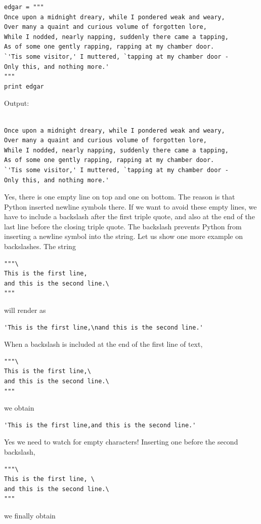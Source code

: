 \begin{verbatim}
edgar = """
Once upon a midnight dreary, while I pondered weak and weary,
Over many a quaint and curious volume of forgotten lore,
While I nodded, nearly napping, suddenly there came a tapping,
As of some one gently rapping, rapping at my chamber door.
`'Tis some visitor,' I muttered, `tapping at my chamber door -
Only this, and nothing more.'
"""
print edgar
\end{verbatim}
Output:

\begin{verbatim}

Once upon a midnight dreary, while I pondered weak and weary,
Over many a quaint and curious volume of forgotten lore,
While I nodded, nearly napping, suddenly there came a tapping,
As of some one gently rapping, rapping at my chamber door.
`'Tis some visitor,' I muttered, `tapping at my chamber door -
Only this, and nothing more.'

\end{verbatim}
Yes, there is one empty line on top and one on bottom. The reason is that 
Python inserted newline symbols there. If we want to avoid these empty lines, 
we have to include a backslash after the first triple quote, and also at the 
end of the last line before the closing triple quote. The backslash prevents 
Python from inserting a newline symbol into the string. Let us show one more 
example on backslashes. The string 

\begin{verbatim}
"""\
This is the first line,
and this is the second line.\
""" 
\end{verbatim}
will render as

\begin{verbatim}
'This is the first line,\nand this is the second line.' 
\end{verbatim}
When a backslash is included at the end of the first line of text,

\begin{verbatim}
"""\
This is the first line,\
and this is the second line.\
""" 
\end{verbatim}
we obtain 

\begin{verbatim}
'This is the first line,and this is the second line.'
\end{verbatim}
Yes we need to watch for empty characters! Inserting one before the second 
backslash,

\begin{verbatim}
"""\
This is the first line, \
and this is the second line.\
""" 
\end{verbatim}
we finally obtain 

